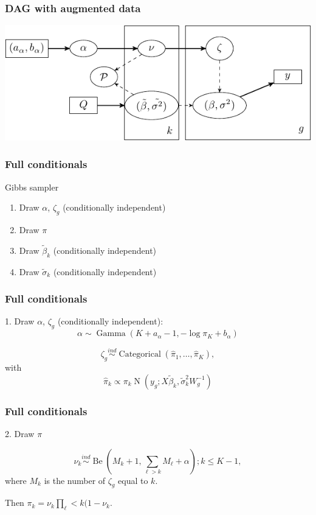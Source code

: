 \documentclass{beamer}
\newcommand{\op}{\operatorname}
\newcommand{\ind}{\stackrel{ind}{\sim}}
\begin{document}
\begin{frame}[label=current]
\frametitle{DAG with augmented data}
\includegraphics[width=\textwidth]{my_dag_small}
\end{frame}

\begin{frame}[label=current]
\frametitle{Full conditionals}
\begin{beamerboxesrounded}[upper=upcol,lower=lowcol,shadow=true]{Gibbs sampler}
  \begin{enumerate}
    \item Draw $\alpha$, $\zeta_g$ (conditionally independent)
    \item Draw $\pi$
    \item Draw $\tilde{\beta}_k$ (conditionally independent)
    \item Draw $\tilde{\sigma}_k$ (conditionally independent)
  \end{enumerate}
\end{beamerboxesrounded}
\end{frame}

\begin{frame}[label=current]
\frametitle{Full conditionals}
1. Draw $\alpha$, $\zeta_g$ (conditionally independent):\\

\[\alpha \sim \op{Gamma}(K + a_\alpha - 1, -\log \pi_K + b_\alpha)\]

\[\zeta_g \ind \op{Categorical}\left(\hat{\pi}_1,\ldots,\hat{\pi}_K \right),\]
with
\[\hat{\pi}_k \propto \pi_k \op{N}(y_g;X\tilde{\beta}_k,\tilde{\sigma}_k^2 W_g^{-1})\]
\end{frame}

\begin{frame}[label=current]
\frametitle{Full conditionals}
2. Draw $\pi$

\[\nu_k \ind \op{Be}(M_k + 1, \sum_{\ell>k}M_\ell + \alpha); k \le K-1,\]
where $M_k$ is the number of $\zeta_g$ equal to $k$.

Then $\pi_k = \nu_k \prod_\ell<k(1-\nu_k$.
\end{frame}
\end{document}
